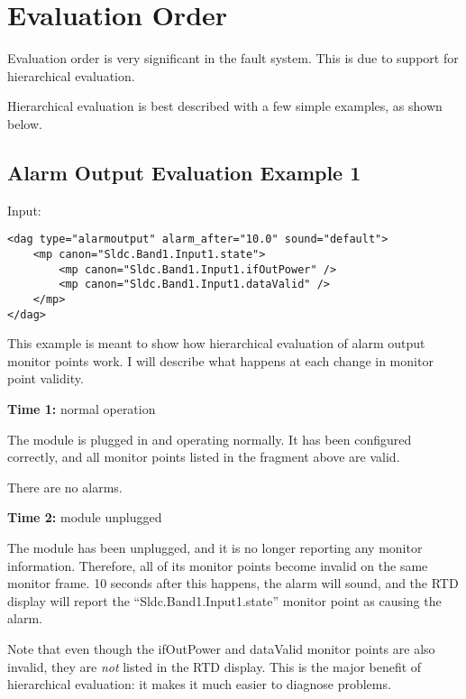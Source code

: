 \documentclass[letterpaper,12pt,oneside,pdftex]{article}
\newcommand{\mytime}[2]{\textbf{Time #1:} #2}
\begin{document}
\section{Evaluation Order}

Evaluation order is very significant in the fault system. This is due to
support for hierarchical evaluation.

Hierarchical evaluation is best described with a few simple examples, as shown
below.

\subsection{Alarm Output Evaluation Example 1}
\label{alarmoutput-example1}

\begin{minipage}{\textwidth}
Input: \\
\begin{scriptsize}
\begin{verbatim}
<dag type="alarmoutput" alarm_after="10.0" sound="default">
    <mp canon="Sldc.Band1.Input1.state">
        <mp canon="Sldc.Band1.Input1.ifOutPower" />
        <mp canon="Sldc.Band1.Input1.dataValid" />
    </mp>
</dag>
\end{verbatim}
\end{scriptsize}
\end{minipage}

This example is meant to show how hierarchical evaluation of alarm output
monitor points work. I will describe what happens at each change in monitor
point validity.

\mytime{1}{normal operation}

The module is plugged in and operating normally. It has been configured
correctly, and all monitor points listed in the fragment above are valid.

There are no alarms.

\mytime{2}{module unplugged}

The module has been unplugged, and it is no longer reporting any monitor
information. Therefore, all of its monitor points become invalid on the same
monitor frame. 10 seconds after this happens, the alarm will sound, and the RTD
display will report the ``Sldc.Band1.Input1.state'' monitor point as causing the
alarm.

Note that even though the ifOutPower and dataValid monitor points are also
invalid, they are \emph{not} listed in the RTD display. This is the major
benefit of hierarchical evaluation: it makes it much easier to diagnose
problems.
\end{document}
